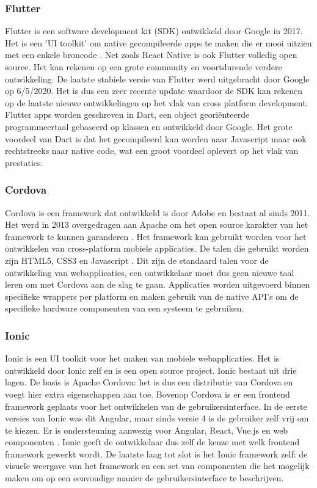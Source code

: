 \subsubsection{Flutter}
\label{subsubsec:Flutter}

Flutter is een software development kit (SDK) ontwikkeld door Google in 2017. Het is een 'UI toolkit' om native gecompileerde apps te maken die er mooi uitzien met een enkele broncode \autocite{Google2020}. Net zoals React Native is ook Flutter volledig open source. Het kan rekenen op een grote community en voortdurende verdere ontwikkeling. De laatste stabiele versie van Flutter werd uitgebracht door Google op 6/5/2020. Het is dus een zeer recente update waardoor de SDK kan rekenen op de laatste nieuwe ontwikkelingen op het vlak van cross platform development. Flutter apps worden geschreven in Dart, een object georiënteerde programmeertaal gebaseerd op klassen en ontwikkeld door Google. Het grote voordeel van Dart is dat het gecompileerd kan worden naar Javascript maar ook rechtstreeks naar native code, wat een groot voordeel oplevert op het vlak van prestaties.

\subsubsection{Cordova}
\label{subsubsec:Cordova}

Cordova is een framework dat ontwikkeld is door Adobe en bestaat al sinds 2011. Het werd in 2013 overgedragen aan Apache om het open source karakter van het framework te kunnen garanderen . Het framework kan gebruikt worden voor het ontwikkelen van cross-platform mobiele applicaties. De talen die gebruikt worden zijn HTML5, CSS3 en Javascript \autocite{Apache2020}. Dit zijn de standaard talen voor de ontwikkeling van webapplicaties, een ontwikkelaar moet dus geen nieuwe taal leren om met Cordova aan de slag te gaan. Applicaties worden uitgevoerd binnen specifieke wrappers per platform en maken gebruik van de native API's om de specifieke hardware componenten van een systeem te gebruiken.

\subsubsection{Ionic}
\label{subsubsec:Ionic}

Ionic is een UI toolkit voor het maken van mobiele webapplicaties. Het is ontwikkeld door Ionic zelf en is een open source project. Ionic bestaat uit drie lagen. De basis is Apache Cordova: het is dus een distributie van Cordova en voegt hier extra eigenschappen aan toe. Bovenop Cordova is er een frontend framework geplaats voor het ontwikkelen van de gebruikersinterface. In de eerste versies van Ionic was dit Angular, maar sinds versie 4 is de gebruiker zelf vrij om te kiezen. Er is ondersteuning aanwezig voor Angular, React, Vue.js en web componenten \autocite{Schiemann2019}. Ionic geeft de ontwikkelaar dus zelf de keuze met welk frontend framework gewerkt wordt. De laatste laag tot slot is het Ionic framework zelf: de visuele weergave van het framework en een set van componenten die het mogelijk maken om op een eenvoudige manier de gebruikersinterface te beschrijven.


